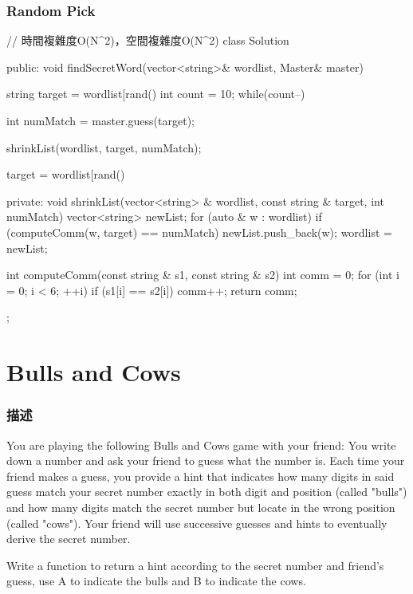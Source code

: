\subsubsection{Random Pick}
\begin{Code}
// 時間複雜度O(N^2)，空間複雜度O(N^2)
class Solution {
public:
    void findSecretWord(vector<string>& wordlist, Master& master) {

        string target = wordlist[rand() %
        int count = 10;
        while(count--) {
            int numMatch = master.guess(target);

            shrinkList(wordlist, target, numMatch);

            target = wordlist[rand() %
        }
    }

private:
    void shrinkList(vector<string> & wordlist, const string & target, int numMatch) {
        vector<string> newList;
        for (auto & w : wordlist) {
            if (computeComm(w, target) == numMatch) {
                newList.push_back(w);
            }
        }
        wordlist = newList;
    }

    int computeComm(const string & s1, const string & s2) {
        int comm = 0;
        for (int i = 0; i < 6; ++i) {
            if (s1[i] == s2[i]) comm++;
        }
        return comm;
    }

};
\end{Code}

\section{Bulls and Cows} %
\label{sec:bulls-and-cows}

\subsubsection{描述}
You are playing the following Bulls and Cows game with your friend: You write down a number and ask your friend to guess what the number is. Each time your friend makes a guess, you provide a hint that indicates how many digits in said guess match your secret number exactly in both digit and position (called "bulls") and how many digits match the secret number but locate in the wrong position (called "cows"). Your friend will use successive guesses and hints to eventually derive the secret number.

Write a function to return a hint according to the secret number and friend's guess, use A to indicate the bulls and B to indicate the cows.

